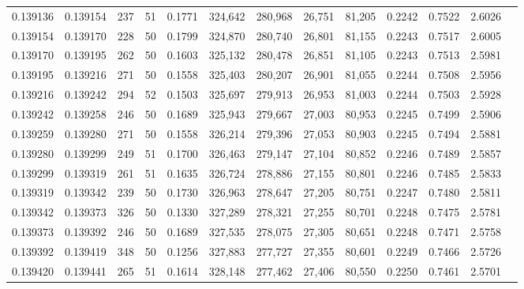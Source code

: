 \begin{tabular}{rrrrrrrrrrrrr}
0.139136 & 0.139154 &   237 &  51 &                                     0.1771 & 324,642 & 280,968 &  26,751 &  81,205 & 0.2242 & 0.7522 & 2.6026 \\
0.139154 & 0.139170 &   228 &  50 &                                     0.1799 & 324,870 & 280,740 &  26,801 &  81,155 & 0.2243 & 0.7517 & 2.6005 \\
0.139170 & 0.139195 &   262 &  50 &                                     0.1603 & 325,132 & 280,478 &  26,851 &  81,105 & 0.2243 & 0.7513 & 2.5981 \\
0.139195 & 0.139216 &   271 &  50 &                                     0.1558 & 325,403 & 280,207 &  26,901 &  81,055 & 0.2244 & 0.7508 & 2.5956 \\
0.139216 & 0.139242 &   294 &  52 &                                     0.1503 & 325,697 & 279,913 &  26,953 &  81,003 & 0.2244 & 0.7503 & 2.5928 \\
0.139242 & 0.139258 &   246 &  50 &                                     0.1689 & 325,943 & 279,667 &  27,003 &  80,953 & 0.2245 & 0.7499 & 2.5906 \\
0.139259 & 0.139280 &   271 &  50 &                                     0.1558 & 326,214 & 279,396 &  27,053 &  80,903 & 0.2245 & 0.7494 & 2.5881 \\
0.139280 & 0.139299 &   249 &  51 &                                     0.1700 & 326,463 & 279,147 &  27,104 &  80,852 & 0.2246 & 0.7489 & 2.5857 \\
0.139299 & 0.139319 &   261 &  51 &                                     0.1635 & 326,724 & 278,886 &  27,155 &  80,801 & 0.2246 & 0.7485 & 2.5833 \\
0.139319 & 0.139342 &   239 &  50 &                                     0.1730 & 326,963 & 278,647 &  27,205 &  80,751 & 0.2247 & 0.7480 & 2.5811 \\
0.139342 & 0.139373 &   326 &  50 &                                     0.1330 & 327,289 & 278,321 &  27,255 &  80,701 & 0.2248 & 0.7475 & 2.5781 \\
0.139373 & 0.139392 &   246 &  50 &                                     0.1689 & 327,535 & 278,075 &  27,305 &  80,651 & 0.2248 & 0.7471 & 2.5758 \\
0.139392 & 0.139419 &   348 &  50 &                                     0.1256 & 327,883 & 277,727 &  27,355 &  80,601 & 0.2249 & 0.7466 & 2.5726 \\
0.139420 & 0.139441 &   265 &  51 &                                     0.1614 & 328,148 & 277,462 &  27,406 &  80,550 & 0.2250 & 0.7461 & 2.5701 \\

\end{tabular}
